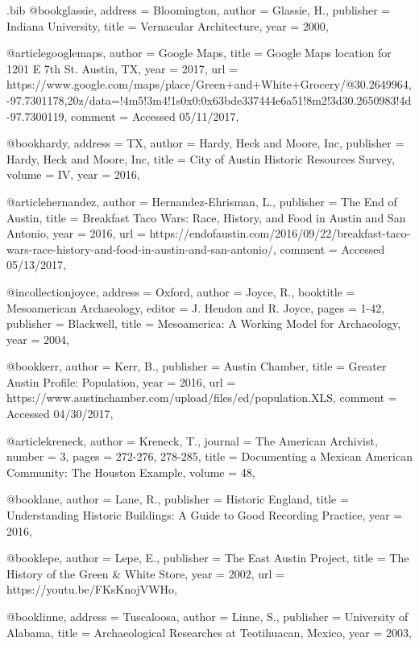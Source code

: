 \begin{filecontents}{\IJSRAidentifier.bib}
@book{glassie,
	address = {Bloomington},
	author = {Glassie, H.},
	publisher = {Indiana University},
	title = {Vernacular Architecture},
	year = {2000},
}

@article{googlemaps,
	author = {Google Maps},
	title = {Google Maps location for 1201 E 7th St. Austin, TX},
	year = {2017},
	url = {https://www.google.com/maps/place/Green+and+White+Grocery/@30.2649964,-97.7301178,20z/data=!4m5!3m4!1s0x0:0x63bde337444e6a51!8m2!3d30.2650983!4d-97.7300119},
	comment = {Accessed 05/11/2017},
}

@book{hardy,
	address = {TX},
	author = {Hardy, Heck and Moore, Inc},
	publisher = {Hardy, Heck and Moore, Inc},
	title = {City of Austin Historic Resources Survey},
	volume = {IV},
	year = {2016},
}

@article{hernandez,
	author = {Hernandez-Ehrisman, L.},
	publisher = {The End of Austin},
	title = {Breakfast Taco Wars: Race, History, and Food in Austin and San Antonio},
	year = {2016},
	url = {https://endofaustin.com/2016/09/22/breakfast-taco-wars-race-history-and-food-in-austin-and-san-antonio/},
	comment = {Accessed 05/13/2017},
}

@incollection{joyce,
	address = {Oxford},
	author = {Joyce, R.},
	booktitle = {Mesoamerican Archaeology},
	editor = {J. Hendon and R. Joyce},
	pages = {1-42},
	publisher = {Blackwell},
	title = {Mesoamerica: A Working Model for Archaeology},
	year = {2004},
}

@book{kerr,
	author = {Kerr, B.},
	publisher = {Austin Chamber},
	title = {Greater Austin Profile: Population},
	year = {2016},
	url = {https://www.austinchamber.com/upload/files/ed/population.XLS},
	comment = {Accessed 04/30/2017},
}

@article{kreneck,
	author = {Kreneck, T.},
	journal = {The American Archivist},
	number = {3},
	pages = {272-276, 278-285},
	title = {Documenting a Mexican American Community: The Houston Example},
	volume = {48},
}

@book{lane,
	author = {Lane, R.},
	publisher = {Historic England},
	title = {Understanding Historic Buildings: A Guide to Good Recording Practice},
	year = {2016},
}

@book{lepe,
	author = {Lepe, E.},
	publisher = {The East Austin Project},
	title = {The History of the Green \& White Store},
	year = {2002},
	url = {https://youtu.be/FKsKnojVWHo},
}

@book{linne,
	address = {Tuscaloosa},
	author = {Linne, S.},
	publisher = {University of Alabama},
	title = {Archaeological Researches at Teotihuacan, Mexico},
	year = {2003},
}


\end{filecontents}
